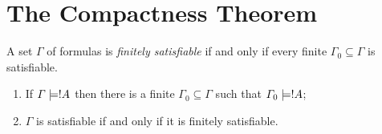 \documentclass[open-logic-section]{subfiles}
\begin{document}
\section{The Compactness Theorem}

\begin{defn}
  A set $\Gamma$ of formulas is \emph{finitely satisfiable} if and
  only if every finite $\Gamma_0 \subseteq \Gamma$ is satisfiable.
\end{defn}

\begin{thm} 
\begin{enumerate}
  \item If $\Gamma \Entails !A$ then there is a finite $\Gamma_0
    \subseteq \Gamma$ such that $\Gamma_0 \Entails !A$;
  \item $\Gamma$ is satisfiable if and only if it is finitely
    satisfiable. 
\end{enumerate}
\end{thm}
\end{document}
